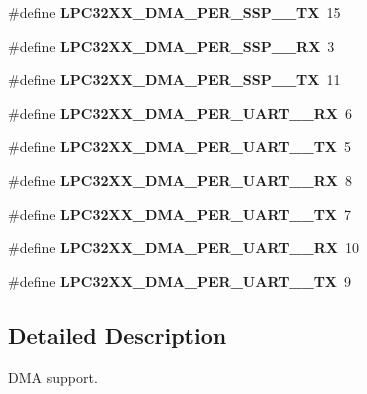 \begin{DoxyCompactItemize}
\#define {\bfseries L\+P\+C32\+X\+X\+\_\+\+D\+M\+A\+\_\+\+P\+E\+R\+\_\+\+S\+S\+P\+\_\+\_\+\+TX}~15
\item 
\mbox{\label{group__lpc__dma_ga1cfd6458b4358abcbd6ccbf4db5917cf}} 
\#define {\bfseries L\+P\+C32\+X\+X\+\_\+\+D\+M\+A\+\_\+\+P\+E\+R\+\_\+\+S\+S\+P\+\_\+\_\+\+RX}~3
\item 
\mbox{\label{group__lpc__dma_ga391f46b3c3a147ae4f431f3d346d4417}} 
\#define {\bfseries L\+P\+C32\+X\+X\+\_\+\+D\+M\+A\+\_\+\+P\+E\+R\+\_\+\+S\+S\+P\+\_\+\_\+\+TX}~11
\item 
\mbox{\label{group__lpc__dma_gab33285a9f5a7c4ccea7266c10528e490}} 
\#define {\bfseries L\+P\+C32\+X\+X\+\_\+\+D\+M\+A\+\_\+\+P\+E\+R\+\_\+\+U\+A\+R\+T\+\_\+\_\+\+RX}~6
\item 
\mbox{\label{group__lpc__dma_gabb352a0d933facc3654d40cce81c4247}} 
\#define {\bfseries L\+P\+C32\+X\+X\+\_\+\+D\+M\+A\+\_\+\+P\+E\+R\+\_\+\+U\+A\+R\+T\+\_\+\_\+\+TX}~5
\item 
\mbox{\label{group__lpc__dma_ga935dc6dec1840431022d0f2d161f47a5}} 
\#define {\bfseries L\+P\+C32\+X\+X\+\_\+\+D\+M\+A\+\_\+\+P\+E\+R\+\_\+\+U\+A\+R\+T\+\_\+\_\+\+RX}~8
\item 
\mbox{\label{group__lpc__dma_ga192e11ed22bc5da857ffc1c1c8dfc588}} 
\#define {\bfseries L\+P\+C32\+X\+X\+\_\+\+D\+M\+A\+\_\+\+P\+E\+R\+\_\+\+U\+A\+R\+T\+\_\+\_\+\+TX}~7
\item 
\mbox{\label{group__lpc__dma_ga4d9809b9725b325e6e7dcf30e96e5600}} 
\#define {\bfseries L\+P\+C32\+X\+X\+\_\+\+D\+M\+A\+\_\+\+P\+E\+R\+\_\+\+U\+A\+R\+T\+\_\+\_\+\+RX}~10
\item 
\mbox{\label{group__lpc__dma_gae78bf05e5709d57a21bf7fde8de2a5a6}} 
\#define {\bfseries L\+P\+C32\+X\+X\+\_\+\+D\+M\+A\+\_\+\+P\+E\+R\+\_\+\+U\+A\+R\+T\+\_\+\_\+\+TX}~9
\end{DoxyCompactItemize}


\subsection{Detailed Description}
D\+MA support. 

